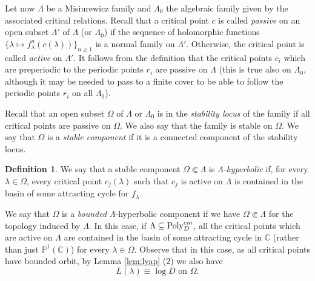 \documentclass[11pt]{amsart}
\theoremstyle{plain}
\theoremstyle{definition}
\newtheorem{defn}[thm]{Definition}
\theoremstyle{remark}
\begin{document}
\medskip

Let now $\Lambda$ be a Misiurewicz family and $\Lambda_0$ the algebraic family given by the associated critical relations.
Recall that a critical point $c$ is called {\it passive} on
an open subset
$\Lambda'$ of $\Lambda$ (or $\Lambda_0$)
if the sequence of holomorphic functions
$\{\lambda \mapsto f_\lambda^n(c(\lambda))\}_{n\ge 1}$ is a normal family on $\Lambda'$. Otherwise, the critical point is called {\it active} on $\Lambda'$.
It follows from the definition 
that
the critical points $c_i$
which are preperiodic to the periodic points
$r_i$
are passive on $\Lambda$ (this is true also on $\Lambda_0$, although it may be needed to pass to a finite cover to be able to follow the periodic points $r_i$ on all $\Lambda_0$).

\medskip


Recall 
\cite{Lyu83typical,MSS83} that an open subset $\Omega$ of $\Lambda$ or
$\Lambda_0$ 
is in the \emph{stability locus} of the family
if all critical points are passive on $\Omega$. We also say that the family is stable on $\Omega$.
We say that
$\Omega$ is a \emph{stable component} if it is a connected component of the stability locus.

\begin{defn}
We say that a stable component $\Omega\Subset \Lambda$ is {\it $\Lambda$-hyperbolic} if, for every $\lambda \in \Omega$, every critical point $c_j(\lambda)$ such that
$c_j$ is active on $\Lambda$ is contained in the basin of some attracting cycle for $f_\lambda$.
\end{defn}

We say that $\Omega$ is a \emph{bounded}
$\Lambda$-hyperbolic component if we have $\Omega \Subset \Lambda$ for the topology induced by $\Lambda$.
In this case, if
$\Lambda \subseteq {\rm Poly}_D^{cm}$,
all the critical points which are active on $\Lambda$ are contained in the basin of some attracting cycle 
in $\mathbb C$
(rather than just $\mathbb P^1(\mathbb C)$)
for every $\lambda\in \Omega$.
Observe that
in this case, as all critical points have bounded orbit,
by Lemma \ref{lem:lyap} (2)
we also have \begin{equation} \label{eq_Lyap_const}
L(\lambda) \equiv \log D \text{ on } \Omega.
\end{equation}
\end{document}
